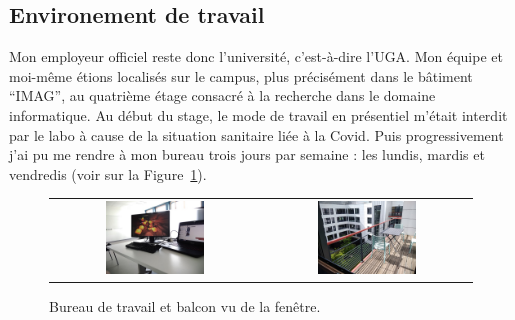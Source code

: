 \subsection{Environement de travail}

Mon employeur officiel reste donc l'université, c'est-à-dire l'UGA. Mon équipe 
et moi-même étions localisés sur le campus, plus précisément dans le bâtiment 
``IMAG'', au quatrième étage consacré à la recherche dans le domaine 
informatique. Au début du stage, le mode de travail en présentiel m'était 
interdit par le labo à cause de la situation sanitaire liée à la Covid. Puis 
progressivement j'ai pu me rendre à mon bureau trois jours par semaine : les 
lundis, mardis et vendredis (voir sur la Figure~\ref{fig:imag}).

\begin{figure}[h!t] \centering
    \begin{tabular}{@{}c@{\hspace{5pt}}c@{}}
    \includegraphics[width=0.49\textwidth]{images/desk} & \includegraphics[width=0.49\textwidth]{images/balcony}
    \end{tabular}
    \caption{Bureau de travail et balcon vu de la fenêtre.}
    \label{fig:imag}
\end{figure}
